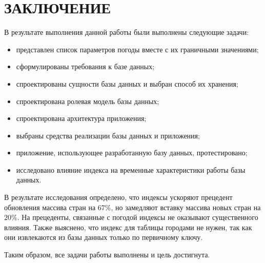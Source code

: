 \chapter*{ЗАКЛЮЧЕНИЕ}

В результате выполнения данной работы были выполнены следующие задачи:
\begin{itemize}
    \item представлен список параметров погоды вместе с их граничными значениями;
    \item сформулированы требования к базе данных;
    \item спроектированы сущности базы данных и выбран способ их хранения;
    \item спроектирована ролевая модель базы данных;
    \item спроектирована архитектура приложения;
    \item выбраны средства реализации базы данных и приложения;
    \item приложение, использующее разработанную базу данных, протестировано;
    \item исследовано влияние индекса на временные характеристики работы базы данных.
\end{itemize}

В результате исследования определено, что индексы ускоряют прецедент обновления массива стран на $67\%$, но замедляют вставку массива новых стран на $20\%$.
На прецеденты, связанные с погодой индексы не оказывают существенного влияния.
Также выяснено, что индекс для таблицы городами не нужен, так как они извлекаются из базы данных только по первичному ключу.

Таким образом, все задачи работы выполнены и цель достигнута.